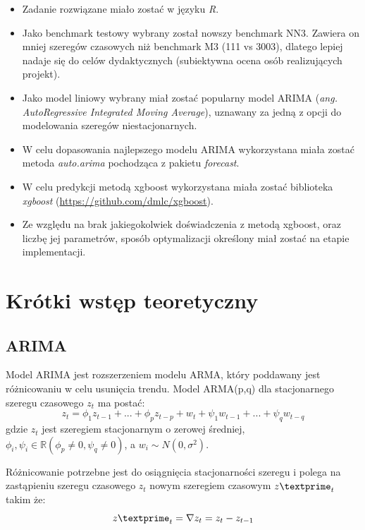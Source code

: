 \documentclass[11pt]{report}
\begin{document}
\begin{itemize}
\item Zadanie rozwiązane miało zostać w języku \textit{R}.

\item Jako benchmark testowy wybrany został nowszy benchmark NN3.
Zawiera on mniej szeregów czasowych niż benchmark M3 (111 vs 3003), dlatego lepiej nadaje się do celów dydaktycznych (subiektywna ocena osób realizujących projekt).

\item Jako model liniowy wybrany miał zostać popularny model ARIMA (\textit{ang. AutoRegressive Integrated Moving Average}), uznawany za jedną z opcji do modelowania szeregów niestacjonarnych.

\item W celu dopasowania najlepszego modelu ARIMA wykorzystana miała zostać metoda \textit{auto.arima} pochodząca z pakietu \textit{forecast}.

\item W celu predykcji metodą xgboost wykorzystana miała zostać biblioteka \textit{xgboost} (\url{https://github.com/dmlc/xgboost}).

\item Ze względu na brak jakiegokolwiek doświadczenia z metodą xgboost, oraz liczbę jej parametrów, sposób optymalizacji określony miał zostać na etapie implementacji.
\end{itemize}

\section{Krótki wstęp teoretyczny}

\subsection{ARIMA}
Model ARIMA jest rozszerzeniem modelu ARMA, który poddawany jest różnicowaniu w celu usunięcia trendu.
Model ARMA(p,q) dla stacjonarnego szeregu czasowego $z_t$ ma postać:
\begin{equation}
    z_t = \phi_1 z_{t-1} + ... + \phi_p z_{t-p} + w_t + \psi_1 w_{t-1} + ... + \psi_q w_{t-q}
\end{equation}
gdzie $z_t$ jest szeregiem stacjonarnym o zerowej średniej, $\phi_i,\psi_i \in \mathbb{R} (\phi_p \neq 0, \psi_q \neq 0)$, a $w_i \sim N(0, \sigma^2)$.

Różnicowanie potrzebne jest do osiągnięcia stacjonarności szeregu i polega na zastąpieniu szeregu czasowego $z_t$ nowym szeregiem czasowym $z\textprime_{t}$ takim że:
\begin{equation}
    z\textprime_{t} = \nabla z_{t} = z_t - z_{t-1}
\end{equation}
\end{document}
